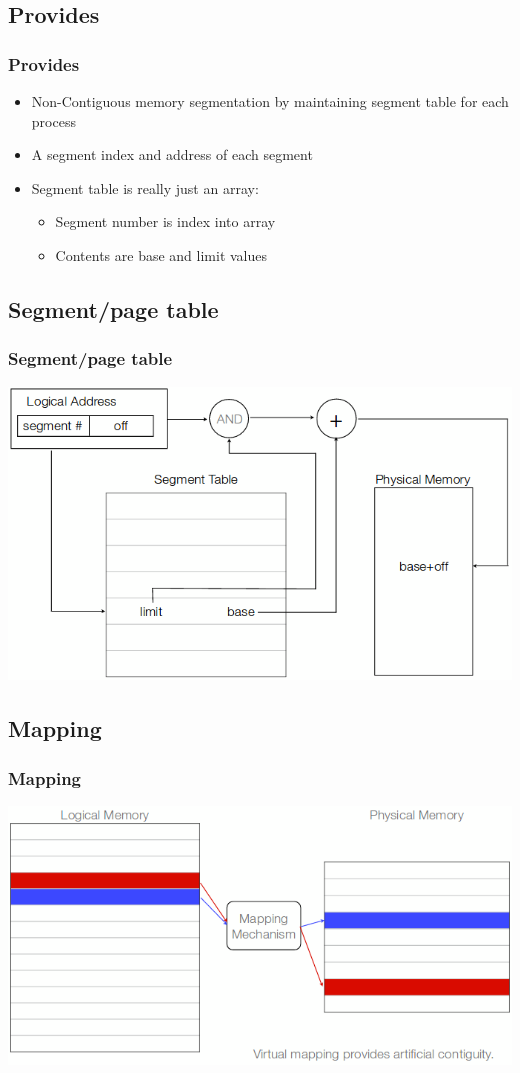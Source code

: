\documentclass{beamer}
\begin{document}
\subsection{Provides}
\begin{frame}
\frametitle{Provides}
\begin{itemize}
\item Non-Contiguous memory segmentation by maintaining segment table for each process
\item A segment index and address of each segment
\item Segment table is really just an array:
\begin{itemize}
\item Segment number is index into array
\item Contents are base and limit values
\end{itemize}
\end{itemize}
\end{frame}
\subsection{Segment/page table}
\begin{frame}
\frametitle{Segment/page table}
\includegraphics[scale=0.5]{segtab.png}
\end{frame}
\subsection{Mapping}
\begin{frame}
\frametitle{Mapping}
\includegraphics[scale=0.5]{mapping.png}
\end{frame}
\end{document}
